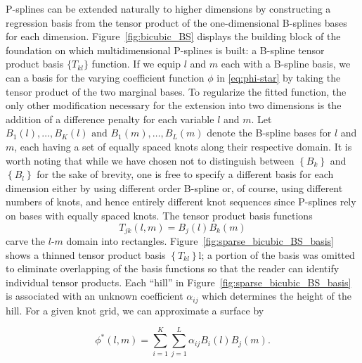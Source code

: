 \documentclass[12pt]{article}
\theoremstyle{definition}
\begin{document}
P-splines can be extended naturally to higher dimensions by constructing a regression basis from the tensor product of the one-dimensional B-splines bases for each dimension. Figure~\ref{fig:bicubic_BS} displays the building block of the foundation on which multidimensional P-splines is built: a B-spline tensor product basis $\big\{ T_{kl}\big\}$ function.  If we equip $l$ and $m$ each with a B-spline basis, we can a basis for the varying coefficient function $\phi$ in \ref{eq:phi-star} by taking the tensor product of the two marginal bases. To regularize the fitted function, the only other modification necessary for the extension into two dimensions is the addition of a difference penalty for each variable $l$ and $m$. Let $B_{1}\left(l\right),\dots, B_{K}\left(l\right)  \mbox{ and } B_{1}\left(m\right),\dots, B_{L}\left(m\right)$  denote the B-spline bases for $l$ and $m$, each having a set of equally spaced knots along their respective domain. It is worth noting that while we have chosen not to distinguish between $\left\{ B_k \right\}$ and $\left\{ {B}_l \right\}$ for the sake of brevity, one is free to specify a different basis for each dimension either by using different order B-spline or, of course, using different numbers of knots, and hence entirely different knot sequences since P-splines rely on bases with equally spaced knots. The tensor product basis functions
\begin{equation*}
T_{jk}\left(l,m\right) = B_j\left(l\right){B}_k\left(m\right)
\end{equation*}
\noindent
 carve the $l$-$m$ domain into rectangles.  Figure~\ref{fig:sparse_bicubic_BS_basis} shows a thinned tensor product basis $\left\{ T_{kl} \right\}$l; a portion of the basis was omitted to eliminate overlapping of the basis functions so that the reader can identify individual tensor products. Each ``hill'' in Figure~\ref{fig:sparse_bicubic_BS_basis} is associated with an unknown coefficient $\alpha_{ij}$ which determines the height of the hill. For a given knot grid, we can approximate a surface by


\begin{equation} \label{eq:varying-coefficient-tensor-product-expansion}
\phi^*\left(l,m\right) = \sum_{i=1}^K \sum_{j=1}^L \alpha_{ij} B_{i}\left(l\right) B_{j}\left(m\right).
\end{equation}
\end{document}

